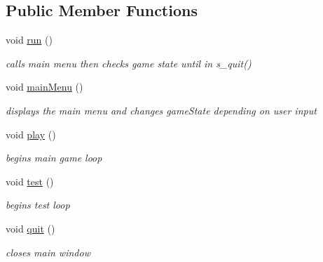 \subsection*{Public Member Functions}
\begin{DoxyCompactItemize}
\item 
\mbox{\label{classGame_a1ab78f5ed0d5ea879157357cf2fb2afa}} 
void \mbox{\hyperlink{classGame_a1ab78f5ed0d5ea879157357cf2fb2afa}{run}} ()
\begin{DoxyCompactList}\small\item\em calls main menu then checks game state until in s\+\_\+quit() \end{DoxyCompactList}\item 
void \mbox{\hyperlink{classGame_a5ed7fc5be77080f7f6dd5363f7f007a1}{main\+Menu}} ()
\begin{DoxyCompactList}\small\item\em displays the main menu and changes game\+State depending on user input \end{DoxyCompactList}\item 
\mbox{\label{classGame_aa333825d0bca80e91e53c7e23f053405}} 
void \mbox{\hyperlink{classGame_aa333825d0bca80e91e53c7e23f053405}{play}} ()
\begin{DoxyCompactList}\small\item\em begins main game loop \end{DoxyCompactList}\item 
\mbox{\label{classGame_a991c1a8d7fd73ab1c2095b12674169a0}} 
void \mbox{\hyperlink{classGame_a991c1a8d7fd73ab1c2095b12674169a0}{test}} ()
\begin{DoxyCompactList}\small\item\em begins test loop \end{DoxyCompactList}\item 
\mbox{\label{classGame_a8272be134d16c277bb014ad6a22fc357}} 
void \mbox{\hyperlink{classGame_a8272be134d16c277bb014ad6a22fc357}{quit}} ()
\begin{DoxyCompactList}\small\item\em closes main window \end{DoxyCompactList}\item 
\mbox{\label{classGame_a4d95b74e7496c0be1c829af66bf1f9f5}} 

\end{DoxyCompactItemize}
